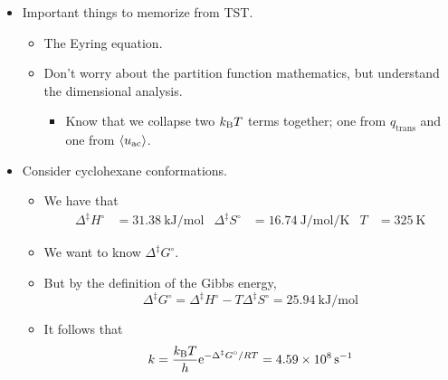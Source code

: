 \documentclass[../notes.tex]{subfiles}
\begin{document}
\begin{itemize}
\begin{itemize}
    \end{itemize}
    \item Important things to memorize from TST.
    \begin{itemize}
        \item The Eyring equation.
        \item Don't worry about the partition function mathematics, but understand the dimensional analysis.
        \begin{itemize}
            \item Know that we collapse two $\kB T$ terms together; one from $q_\text{trans}$ and one from $\prb{u_\text{ac}}$.
        \end{itemize}
    \end{itemize}
    \item Consider cyclohexane conformations.
    \begin{itemize}
        \item We have that
        \begin{align*}
            \Delta^\ddagger H^\circ &= \SI{31.38}{\kilo\joule\per\mole}&
            \Delta^\ddagger S^\circ &= \SI{16.74}{\joule\per\mole\per\kelvin}&
            T &= \SI{325}{\kelvin}
        \end{align*}
        \item We want to know $\Delta^\ddagger G^\circ$.
        \item But by the definition of the Gibbs energy,
        \begin{equation*}
            \Delta^\ddagger G^\circ = \Delta^\ddagger H^\circ-T\Delta^\ddagger S^\circ
            = \SI{25.94}{\kilo\joule\per\mole}
        \end{equation*}
        \item It follows that
        \begin{equation*}
            k = \frac{\kB T}{h}\e[-\Delta^\ddagger G^\circ/RT]
            = \SI{4.59e8}{\per\second}
        \end{equation*}
    \end{itemize}
\end{itemize}
\end{document}
